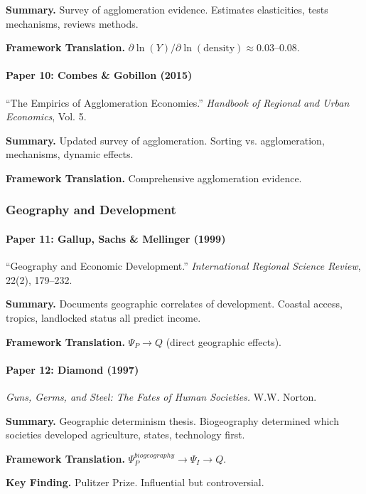 \textbf{Summary.}
Survey of agglomeration evidence. Estimates elasticities, tests 
mechanisms, reviews methods.

\textbf{Framework Translation.}
$\partial \ln(Y) / \partial \ln(\text{density}) \approx 0.03$--$0.08$.

\paragraph{Paper 10: Combes \& Gobillon (2015)}

``The Empirics of Agglomeration Economies.''
\textit{Handbook of Regional and Urban Economics}, Vol. 5.

\textbf{Summary.}
Updated survey of agglomeration. Sorting vs. agglomeration, mechanisms, 
dynamic effects.

\textbf{Framework Translation.}
Comprehensive agglomeration evidence.

\subsubsection{Geography and Development}

\paragraph{Paper 11: Gallup, Sachs \& Mellinger (1999)}

``Geography and Economic Development.''
\textit{International Regional Science Review}, 22(2), 179--232.

\textbf{Summary.}
Documents geographic correlates of development. Coastal access, 
tropics, landlocked status all predict income.

\textbf{Framework Translation.}
$\Psi_P \to Q$ (direct geographic effects).

\paragraph{Paper 12: Diamond (1997)}

\textit{Guns, Germs, and Steel: The Fates of Human Societies.}
W.W. Norton.

\textbf{Summary.}
Geographic determinism thesis. Biogeography determined which societies 
developed agriculture, states, technology first.

\textbf{Framework Translation.}
$\Psi_P^{biogeography} \to \Psi_I \to Q$.

\textbf{Key Finding.}
Pulitzer Prize. Influential but controversial.

